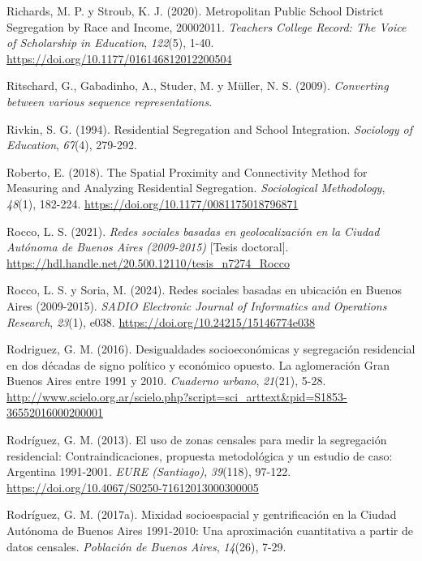 \documentclass[
  spanish,
  a4paper,%
  chapterprefix=true,%
  DIV=calc,%
  twoside]{scrbook}%
\newlength{\cslhangindent}
\newenvironment{CSLReferences}[2] %
 {\begin{list}{}{%
  \setlength{\itemindent}{0pt}
  \setlength{\leftmargin}{0pt}
  \setlength{\parsep}{0pt}
  \ifodd #1
   \setlength{\leftmargin}{\cslhangindent}
   \setlength{\itemindent}{-1\cslhangindent}
  \fi
  \setlength{\itemsep}{#2\baselineskip}}}
 {\end{list}}
\begin{document}
\begin{CSLReferences}{1}{0}
Richards, M. P. y Stroub, K. J. (2020). Metropolitan Public School District Segregation by Race and Income, 2000{\textendash}2011. \emph{Teachers College Record: The Voice of Scholarship in Education}, \emph{122}(5), 1-40. \url{https://doi.org/10.1177/016146812012200504}

Ritschard, G., Gabadinho, A., Studer, M. y Müller, N. S. (2009). \emph{Converting between various sequence representations}.

Rivkin, S. G. (1994). Residential Segregation and School Integration. \emph{Sociology of Education}, \emph{67}(4), 279-292.

Roberto, E. (2018). The Spatial Proximity and Connectivity Method for Measuring and Analyzing Residential Segregation. \emph{Sociological Methodology}, \emph{48}(1), 182-224. \url{https://doi.org/10.1177/0081175018796871}

Rocco, L. S. (2021). \emph{Redes sociales basadas en geolocalización en la Ciudad Autónoma de Buenos Aires (2009-2015)} {[}Tesis doctoral{]}. \url{https://hdl.handle.net/20.500.12110/tesis_n7274_Rocco}

Rocco, L. S. y Soria, M. (2024). Redes sociales basadas en ubicación en Buenos Aires (2009-2015). \emph{SADIO Electronic Journal of Informatics and Operations Research}, \emph{23}(1), e038. \url{https://doi.org/10.24215/15146774e038}

Rodriguez, G. M. (2016). Desigualdades socioeconómicas y segregación residencial en dos décadas de signo político y económico opuesto. La aglomeración Gran Buenos Aires entre 1991 y 2010. \emph{Cuaderno urbano}, \emph{21}(21), 5-28. \url{http://www.scielo.org.ar/scielo.php?script=sci_arttext&pid=S1853-36552016000200001}

Rodríguez, G. M. (2013). El uso de zonas censales para medir la segregación residencial: Contraindicaciones, propuesta metodológica y un estudio de caso: Argentina 1991-2001. \emph{EURE (Santiago)}, \emph{39}(118), 97-122. \url{https://doi.org/10.4067/S0250-71612013000300005}

Rodríguez, G. M. (2017a). Mixidad socioespacial y gentrificación en la Ciudad Autónoma de Buenos Aires 1991-2010: Una aproximación cuantitativa a partir de datos censales. \emph{Población de Buenos Aires}, \emph{14}(26), 7-29.


\end{CSLReferences}
\end{document}

